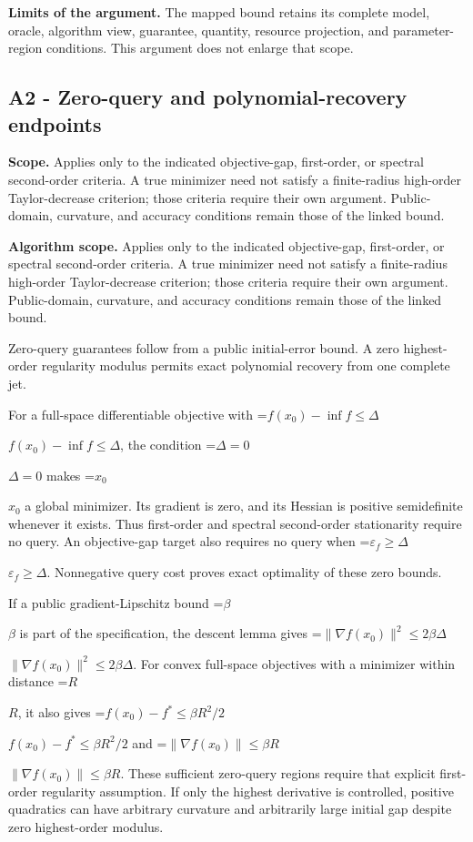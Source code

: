 \documentclass[10pt,a4paper]{article}
\newcommand{\AtlasMath}[1]{\par\begingroup\centering\setbox0=\hbox{$\displaystyle #1$}\ifdim\wd0>1.4\linewidth\typeout{ATLAS WIDE FORMULA: \the\wd0}\fi\ifdim\wd0>\linewidth\resizebox{\linewidth}{!}{\box0}\else\box0\fi\par\endgroup}
\newcommand{\AtlasInlineMath}[1]{\begingroup\setbox0=\hbox{$#1$}\ifdim\wd0>.4\linewidth\endgroup\AtlasMath{#1}\else\endgroup$#1$\fi}
\begin{document}
\textbf{Limits of the argument.} The mapped bound retains its complete model, oracle, algorithm view, guarantee, quantity, resource projection, and parameter-region conditions. This argument does not enlarge that scope.

\subsection{A2 - Zero-query and polynomial-recovery endpoints}
\textbf{Scope.} Applies only to the indicated objective-gap, first-order, or spectral second-order criteria. A true minimizer need not satisfy a finite-radius high-order Taylor-decrease criterion; those criteria require their own argument. Public-domain, curvature, and accuracy conditions remain those of the linked bound.

\textbf{Algorithm scope.} Applies only to the indicated objective-gap, first-order, or spectral second-order criteria. A true minimizer need not satisfy a finite-radius high-order Taylor-decrease criterion; those criteria require their own argument. Public-domain, curvature, and accuracy conditions remain those of the linked bound.

Zero-query guarantees follow from a public initial-error bound. A zero highest-order regularity modulus permits exact polynomial recovery from one complete jet.

For a full-space differentiable objective with \AtlasInlineMath{f(x_0)-\inf f\le\Delta}, the condition \AtlasInlineMath{\Delta=0} makes \AtlasInlineMath{x_0} a global minimizer. Its gradient is zero, and its Hessian is positive semidefinite whenever it exists. Thus first-order and spectral second-order stationarity require no query. An objective-gap target also requires no query when \AtlasInlineMath{\varepsilon_f\ge\Delta}. Nonnegative query cost proves exact optimality of these zero bounds.

If a public gradient-Lipschitz bound \AtlasInlineMath{\beta} is part of the specification, the descent lemma gives \AtlasInlineMath{\|\nabla f(x_0)\|^2\le2\beta\Delta}. For convex full-space objectives with a minimizer within distance \AtlasInlineMath{R}, it also gives \AtlasInlineMath{f(x_0)-f^*\le\beta R^2/2} and \AtlasInlineMath{\|\nabla f(x_0)\|\le\beta R}. These sufficient zero-query regions require that explicit first-order regularity assumption. If only the highest derivative is controlled, positive quadratics can have arbitrary curvature and arbitrarily large initial gap despite zero highest-order modulus.
\end{document}
